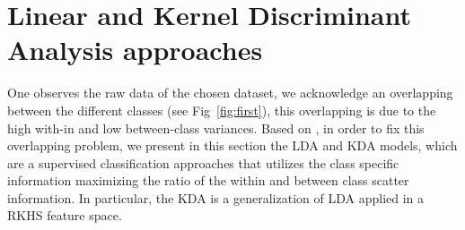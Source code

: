 \documentclass[11pt,a4paper,oneside]{article}
\begin{document}
\section{Linear and Kernel Discriminant Analysis approaches}
\label{kda}
One observes the raw data of the chosen dataset, we acknowledge an overlapping between the different classes (see Fig~\ref{fig:first}), this overlapping is due to the high with-in and low between-class variances. Based on \cite{khan}, in order to fix this overlapping problem, we present in this section the LDA and KDA models, which are a supervised classification approaches that utilizes the class specific information maximizing the ratio of the within and between class scatter information. In particular, the KDA is a generalization of LDA applied in a RKHS feature space.

\begin{figure}[ht!]
\begin{center}


\end{center}
\end{figure}
\end{document}
